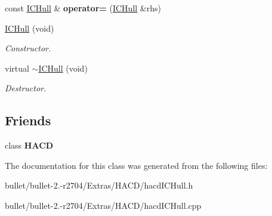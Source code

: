 \begin{DoxyCompactItemize}
\item 
\hypertarget{class_h_a_c_d_1_1_i_c_hull_a413e5c887f122d1429728adc8ba3722e}{const \hyperlink{class_h_a_c_d_1_1_i_c_hull}{I\+C\+Hull} \& {\bfseries operator=} (\hyperlink{class_h_a_c_d_1_1_i_c_hull}{I\+C\+Hull} \&rhs)}\label{class_h_a_c_d_1_1_i_c_hull_a413e5c887f122d1429728adc8ba3722e}

\item 
\hypertarget{class_h_a_c_d_1_1_i_c_hull_adcc637d9460ad4a6afd1b0159f431786}{\hyperlink{class_h_a_c_d_1_1_i_c_hull_adcc637d9460ad4a6afd1b0159f431786}{I\+C\+Hull} (void)}\label{class_h_a_c_d_1_1_i_c_hull_adcc637d9460ad4a6afd1b0159f431786}

\begin{DoxyCompactList}\small\item\em Constructor. \end{DoxyCompactList}\item 
\hypertarget{class_h_a_c_d_1_1_i_c_hull_a5a34bd4f21d9bfe78d148c66949be1c8}{virtual \hyperlink{class_h_a_c_d_1_1_i_c_hull_a5a34bd4f21d9bfe78d148c66949be1c8}{$\sim$\+I\+C\+Hull} (void)}\label{class_h_a_c_d_1_1_i_c_hull_a5a34bd4f21d9bfe78d148c66949be1c8}

\begin{DoxyCompactList}\small\item\em Destructor. \end{DoxyCompactList}\end{DoxyCompactItemize}
\subsection*{Friends}
\begin{DoxyCompactItemize}
\item 
\hypertarget{class_h_a_c_d_1_1_i_c_hull_ab3497bc7797561d0c79ecef2f462e43a}{class {\bfseries H\+A\+C\+D}}\label{class_h_a_c_d_1_1_i_c_hull_ab3497bc7797561d0c79ecef2f462e43a}

\end{DoxyCompactItemize}


The documentation for this class was generated from the following files\+:\begin{DoxyCompactItemize}
\item 
bullet/bullet-\/2.-\/r2704/\+Extras/\+H\+A\+C\+D/hacd\+I\+C\+Hull.\+h\item 
bullet/bullet-\/2.-\/r2704/\+Extras/\+H\+A\+C\+D/hacd\+I\+C\+Hull.\+cpp\end{DoxyCompactItemize}
